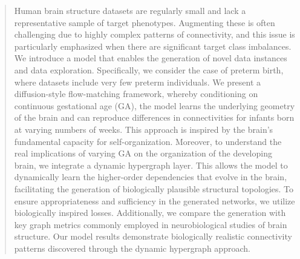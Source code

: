 \documentclass[sigconf, review]{acmart}
\begin{document}
\begin{abstract}


Human brain structure datasets are regularly small and lack a representative sample of target phenotypes. Augmenting these is often challenging due to highly complex patterns of connectivity, and this issue is particularly emphasized when there are significant target class imbalances. We introduce a model that enables the generation of novel data instances and data exploration. Specifically, we consider the case of preterm birth, where datasets include very few preterm individuals. We present a diffusion-style flow-matching framework, whereby conditioning on continuous gestational age (GA), the model learns the underlying geometry of the brain and can reproduce differences in connectivities for infants born at varying numbers of weeks. This approach is inspired by the brain's fundamental capacity for self-organization. Moreover, to understand the real implications of varying GA on the organization of the developing brain, we integrate a dynamic hypergraph layer. This allows the model to dynamically learn the higher-order dependencies that evolve in the brain, facilitating the generation of biologically plausible structural topologies. To ensure appropriateness and sufficiency in the generated networks, we utilize biologically inspired losses. Additionally, we compare the generation with key graph metrics commonly employed in neurobiological studies of brain structure. Our model results demonstrate biologically realistic connectivity patterns discovered through the dynamic hypergraph approach.

\end{abstract}

\maketitle
\end{document}

